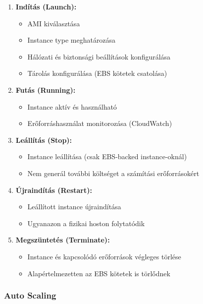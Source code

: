 \documentclass[a4paper,12pt]{article}
\begin{document}
    \begin{enumerate}
        \item \textbf{Indítás (Launch):}
        \begin{itemize}
            \item AMI kiválasztása
            \item Instance type meghatározása
            \item Hálózati és biztonsági beállítások konfigurálása
            \item Tárolás konfigurálása (EBS kötetek csatolása)
        \end{itemize}

        \item \textbf{Futás (Running):}
        \begin{itemize}
            \item Instance aktív és használható
            \item Erőforráshasználat monitorozása (CloudWatch)
        \end{itemize}

        \item \textbf{Leállítás (Stop):}
        \begin{itemize}
            \item Instance leállítása (csak EBS-backed instance-oknál)
            \item Nem generál további költséget a számítási erőforrásokért
        \end{itemize}

        \item \textbf{Újraindítás (Restart):}
        \begin{itemize}
            \item Leállított instance újraindítása
            \item Ugyanazon a fizikai hoston folytatódik
        \end{itemize}

        \item \textbf{Megszüntetés (Terminate):}
        \begin{itemize}
            \item Instance és kapcsolódó erőforrások végleges törlése
            \item Alapértelmezetten az EBS kötetek is törlődnek
        \end{itemize}
    \end{enumerate}

    \subsubsection{Auto Scaling}
\end{document}
